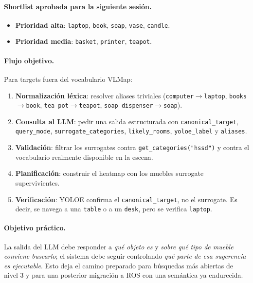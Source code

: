 \documentclass[11pt,a4paper]{article}
\begin{document}
\paragraph{Shortlist aprobada para la siguiente sesión.}
\begin{itemize}
  \item \textbf{Prioridad alta}: \texttt{laptop}, \texttt{book},
        \texttt{soap}, \texttt{vase}, \texttt{candle}.
  \item \textbf{Prioridad media}: \texttt{basket}, \texttt{printer},
        \texttt{teapot}.
\end{itemize}

\paragraph{Flujo objetivo.} Para targets fuera del vocabulario VLMap:
\begin{enumerate}
  \item \textbf{Normalización léxica}: resolver aliases triviales
        (\texttt{computer}$\rightarrow$\texttt{laptop},
        \texttt{books}$\rightarrow$\texttt{book},
        \texttt{tea pot}$\rightarrow$\texttt{teapot},
        \texttt{soap dispenser}$\rightarrow$\texttt{soap}).
  \item \textbf{Consulta al LLM}: pedir una salida estructurada con
        \texttt{canonical\_target}, \texttt{query\_mode},
        \texttt{surrogate\_categories}, \texttt{likely\_rooms},
        \texttt{yoloe\_label} y \texttt{aliases}.
  \item \textbf{Validación}: filtrar los surrogates contra
        \texttt{get\_categories("hssd")} y contra el vocabulario realmente
        disponible en la escena.
  \item \textbf{Planificación}: construir el heatmap con los muebles surrogate
        supervivientes.
  \item \textbf{Verificación}: YOLOE confirma el
        \texttt{canonical\_target}, no el surrogate. Es decir, se navega a una
        \texttt{table} o a un \texttt{desk}, pero se verifica
        \texttt{laptop}.
\end{enumerate}

\paragraph{Objetivo práctico.} La salida del LLM debe responder a
\emph{qué objeto es} y \emph{sobre qué tipo de mueble conviene buscarlo}; el
sistema debe seguir controlando \emph{qué parte de esa sugerencia es
ejecutable}. Esto deja el camino preparado para búsquedas más abiertas de nivel
3 y para una posterior migración a ROS con una semántica ya endurecida.
\end{document}
